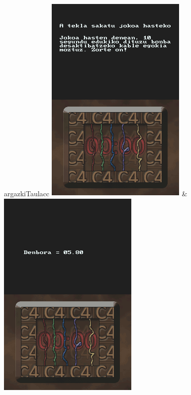 \documentclass[dvipsnames]{../../../../AritzhClass}
\begin{document}
\begin{taula}{}{argazkiTaula}{cc}
\includegraphics[scale=0.75]{Jokoa1} & \includegraphics[scale=0.75]{Jokoa2} \\

\end{taula}
\end{document}
